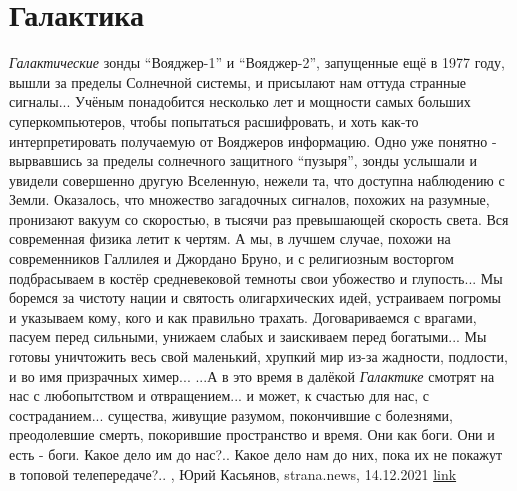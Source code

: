  
 
 
 
 
\chapter{Галактика}
\label{sec:slova.galaktika}

\emph{Галактические} зонды \enquote{Вояджер-1} и \enquote{Вояджер-2}, запущенные ещё в 1977 году,
вышли за пределы Солнечной системы, и присылают нам оттуда странные сигналы...
Учёным понадобится несколько лет и мощности самых больших суперкомпьютеров,
чтобы попытаться расшифровать, и хоть как-то интерпретировать получаемую от
Вояджеров информацию. Одно уже понятно - вырвавшись за пределы солнечного
защитного \enquote{пузыря}, зонды услышали и увидели совершенно другую Вселенную,
нежели та, что доступна наблюдению с Земли.  Оказалось, что множество
загадочных сигналов, похожих на разумные, пронизают вакуум со скоростью, в
тысячи раз превышающей скорость света. Вся современная физика летит к чертям. А
мы, в лучшем случае, похожи на современников Галлилея и Джордано Бруно, и с
религиозным восторгом подбрасываем в костёр средневековой темноты свои
убожество и глупость...  Мы боремся за чистоту нации и святость олигархических
идей, устраиваем погромы и указываем кому, кого и как правильно трахать.
Договариваемся с врагами, пасуем перед сильными, унижаем слабых и заискиваем
перед богатыми... Мы готовы уничтожить весь свой маленький, хрупкий мир из-за
жадности, подлости, и во имя призрачных химер...  ...А в это время в далёкой
\emph{Галактике} смотрят на нас с любопытством и отвращением... и может, к счастью для
нас, с состраданием... существа, живущие разумом, покончившие с болезнями,
преодолевшие смерть, покорившие пространство и время.  Они как боги. Они и есть
- боги. Какое дело им до нас?.. Какое дело нам до них, пока их не покажут в
топовой телепередаче?..
, 
Юрий Касьянов, strana.news, 14.12.2021
\href{https://strana.news/opinions/367041-my-boremsja-za-chistotu-natsii-i-svjatost-oliharkhicheskikh-idej.html}{link}
